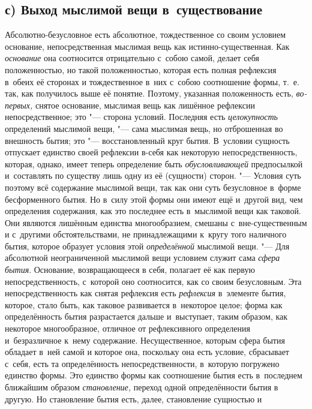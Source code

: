 \subsection%
[с) Выход мыслимой вещи в~существование]%
{с) Выход мыслимой вещи в~существование}

Абсолютно-безусловное есть абсолютное,
тождественное со своим условием основание, непосредственная мыслимая вещь
как истинно-существенная. Как {\em основание} она
соотносится отрицательно с~собою самой, делает себя положенностью, но такой
положенностью, которая есть полная рефлексия в~обеих её сторонах и
тождественное в~них с~собою соотношение формы, т.~е. так, как получилось
выше её понятие. Поэтому, указанная положенность есть,
{\em во-первых,} снятое основание, мыслимая вещь как
лишённое рефлексии непосредственное; это "--- сторона условий. Последняя есть
{\em целокупность} определений мыслимой вещи, "--- сама
мыслимая вещь, но отброшенная во внешность бытия; это "--- восстановленный
круг бытия. В~условии сущность отпускает единство своей рефлексии в-себя
как некоторую непосредственность, которая, однако, имеет теперь определение
быть {\em обусловливающей} предпосылкой и~составлять по
существу лишь одну из её (сущности) сторон. "--- Условия суть поэтому всё
содержание мыслимой вещи, так как они суть безусловное в~форме
бесформенного бытия. Но в~силу этой формы они имеют ещё и~другой вид, чем
определения содержания, как это последнее есть в~мыслимой вещи как таковой.
Они являются лишённым единства многообразием, смешаны с~вне-существенным и
с~другими обстоятельствами, не принадлежащими к~кругу того наличного бытия,
которое образует условия этой {\em определённой}
мыслимой вещи. "--- Для абсолютной неограниченной мыслимой вещи условием служит
сама {\em сфера бытия}. Основание, возвращающееся в
себя, полагает её как первую непосредственность, с~которой оно соотносится,
как со своим безусловным. Эта непосредственность как снятая рефлексия есть
{\em рефлексия} в~элементе бытия, которое, стало быть,
как таковое развивается в~некоторое целое; форма как определённость бытия
разрастается дальше и~выступает, таким образом, как некоторое
многообразное, отличное от рефлексивного определения и~безразличное к~нему
содержание. Несущественное, которым сфера бытия обладает в~ней самой и
которое она, поскольку она есть условие, сбрасывает с~себя, есть та
определённость непосредственности, в~которую погружено единство формы. Это
единство формы как соотношение бытия есть в~последнем ближайшим образом
{\em становление,} переход одной определённости бытия в
другую. Но становление бытия есть, далее, становление сущностью и
